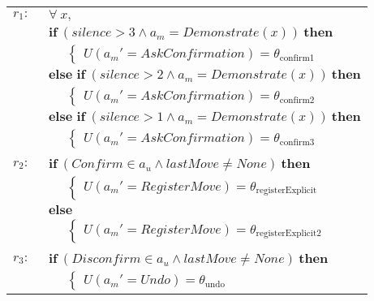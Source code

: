 \begin{footnotesize}
\begin{longtable}{p{1cm}l} 
$r_{1}: \ \ $ &  $\forall \ x, $ \\ & $\textbf{if} \ (\mathit{silence}\!>\!\mathit{3} \land \mathit{a_m}\!=\!\mathit{Demonstrate}(x)) \ \textbf{then}$ \\
& $\;\;\;\;\; \begin{cases}U(\mathit{a_m}'\!=\!\mathit{AskConfirmation})\!=\!\theta_{\mathrm{confirm1}}\end{cases}$ \\ 
& $\textbf{else if} \ (\mathit{silence}\!>\!\mathit{2} \land \mathit{a_m}\!=\!\mathit{Demonstrate}(x)) \ \textbf{then}$ \\
& $\;\;\;\;\; \begin{cases}U(\mathit{a_m}'\!=\!\mathit{AskConfirmation})\!=\!\theta_{\mathrm{confirm2}}\end{cases}$ \\ 
& $\textbf{else if} \ (\mathit{silence}\!>\!\mathit{1} \land \mathit{a_m}\!=\!\mathit{Demonstrate}(x)) \ \textbf{then}$ \\
& $\;\;\;\;\; \begin{cases}U(\mathit{a_m}'\!=\!\mathit{AskConfirmation})\!=\!\theta_{\mathrm{confirm3}}\end{cases}$ \\ \\[-1mm]
$r_{2}: \ \ $ & $\textbf{if} \ (\mathit{Confirm}\!\in\!\mathit{a_u} \land \mathit{lastMove}\!\neq\!\mathit{None}) \ \textbf{then}$ \\
& $\;\;\;\;\; \begin{cases}U(\mathit{a_m}'\!=\!\mathit{RegisterMove})\!=\!\theta_{\mathrm{registerExplicit}}\end{cases}$\\ 
& $\textbf{else}$ \\
& $\;\;\;\;\; \begin{cases}U(\mathit{a_m}'\!=\!\mathit{RegisterMove})\!=\!\theta_{\mathrm{registerExplicit2}}\end{cases}$ \\ \\[-1mm] 
$r_{3}: \ \ $& $\textbf{if} \ (\mathit{Disconfirm}\!\in\!\mathit{a_u} \land \mathit{lastMove}\!\neq\!\mathit{None}) \ \textbf{then}$ \\
& $\;\;\;\;\; \begin{cases}U(\mathit{a_m}'\!=\!\mathit{Undo})\!=\!\theta_{\mathrm{undo}}\end{cases}$ \\ 

\end{longtable}
\end{footnotesize}
